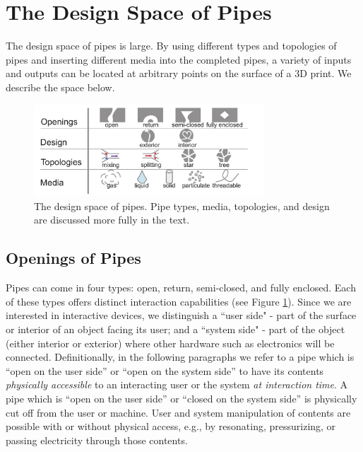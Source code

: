 \section{The Design Space of Pipes}
The design space of pipes is large.  By using different types and topologies of pipes and inserting different media into the completed pipes, a variety of inputs and outputs can be located at arbitrary points on the surface of a 3D print.  We describe the space below.

\begin{figure}[h!]
\centering
    \includegraphics[width=3.4in]{figures/tubespace.pdf}
\caption{The design space of pipes.  Pipe types, media, topologies, and design are discussed more fully in the text.}
\label{fig:pipespace}
\end{figure}

\subsection{Openings of Pipes}

Pipes can come in four types: open, return, semi-closed, and fully enclosed.  Each of these types offers distinct interaction capabilities (see Figure \ref{fig:pipespace}).  Since we are interested in interactive devices, we distinguish a ``user side" - part of the surface or interior of an object facing its user; and a ``system side" - part of the object (either interior or exterior) where other hardware such as electronics will be connected.  Definitionally, in the following paragraphs we refer to a pipe which is ``open on the user side'' or ``open on the system side'' to have its contents \emph{physically accessible} to an interacting user or the system \emph{at interaction time}.  A pipe which is ``open on the user side'' or ``closed on the system side'' is physically cut off from the user or machine.  User and system manipulation of contents are possible with or without physical access, e.g., by resonating, pressurizing, or passing electricity through those contents.

